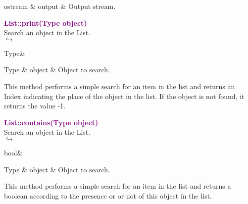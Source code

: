 \begin{tcolorbox}[width=\textwidth,myArgs,tabularx={ll|R}]
ostream & output & Output stream.
\end{tcolorbox}


\textcolor{purple}{\textbf{List::print(Type object)}}\label{List::print(Type object)}\\
Search an object in the List.\\ \hspace*{5mm}$\hookrightarrow$
\vspace*{-2em}\begin{tcolorbox}[grow to left by=-1cm, width=\textwidth-1cm,myArgs,tabularx={l|R}]
Type&
\end{tcolorbox}

\begin{tcolorbox}[width=\textwidth,myArgs,tabularx={ll|R}]
Type & object & Object to search.
\end{tcolorbox}

This method performs a simple search for an item in the list and returns an Index indicating the place of the object in the list.
If the object is not found, it returns the value -1.

\textcolor{purple}{\textbf{List::contains(Type object)}}\label{List::contains(Type object)}\\
Search an object in the List.\\ \hspace*{5mm}$\hookrightarrow$
\vspace*{-2em}\begin{tcolorbox}[grow to left by=-1cm, width=\textwidth-1cm,myArgs,tabularx={l|R}]
bool&
\end{tcolorbox}

\begin{tcolorbox}[width=\textwidth,myArgs,tabularx={ll|R}]
Type & object & Object to search.
\end{tcolorbox}

This method performs a simple search for an item in the list and returns a boolean according to the presence or or not of this object in the list.


